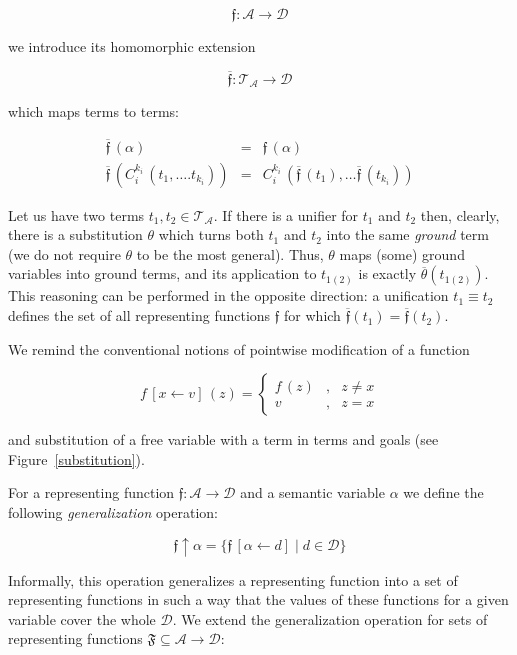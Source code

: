 \[
\mathfrak{f} : \mathcal{A}\to\mathcal{D}
\]

we introduce its homomorphic extension 

\[
  \overline{\mathfrak{f}}:\mathcal{T_A}\to\mathcal{D}
\]

which maps terms to terms:

\[
\begin{array}{rcl}

  \overline{\mathfrak f}\,(\alpha) & = & \mathfrak f\,(\alpha)\\
  \overline{\mathfrak f}\,(C_i^{k_i}\,(t_1,\dots.t_{k_i})) & = & C_i^{k_i}\,(\overline{\mathfrak f}\,(t_1),\dots \overline{\mathfrak f}\,(t_{k_i}))
\end{array}
\]

Let us have two terms $t_1, t_2\in\mathcal{T_A}$. If there is a unifier for $t_1$ and $t_2$ then, clearly, there is a substitution $\theta$ which
turns both $t_1$ and $t_2$ into the same \emph{ground} term (we do not require $\theta$ to be the most general). Thus, $\theta$ maps
(some) ground variables into ground terms, and its application to $t_{1(2)}$ is exactly $\overline{\theta}(t_{1(2)})$. This reasoning can be
performed in the opposite direction: a unification $t_1\equiv t_2$ defines the set of all representing functions $\mathfrak{f}$ for which
$\overline{\mathfrak{f}}(t_1)=\overline{\mathfrak{f}}(t_2)$. 

We remind the conventional notions of pointwise modification of a function

\[
f\,[x\gets v]\,(z)=\left\{
\begin{array}{rcl}
  f\,(z) &,& z \ne x \\
  v      &,& z = x
\end{array}
\right.
\]

and substitution of a free variable with a term in terms and goals (see Figure~\ref{substitution}).

For a representing function $\mathfrak{f}:\mathcal{A}\to\mathcal{D}$ and a semantic variable $\alpha$ we define
the following \emph{generalization} operation:

\[
\mathfrak{f}\uparrow\alpha = \{ \mathfrak{f}\,[\alpha\gets d] \mid d\in\mathcal D\}
\]

Informally, this operation generalizes a representing function into a set of representing functions in such a way that the
values of these functions for a given variable cover the whole $\mathcal{D}$. We extend the generalization operation for sets of
representing functions $\mathfrak{F}\subseteq\mathcal{A}\to\mathcal{D}$:

